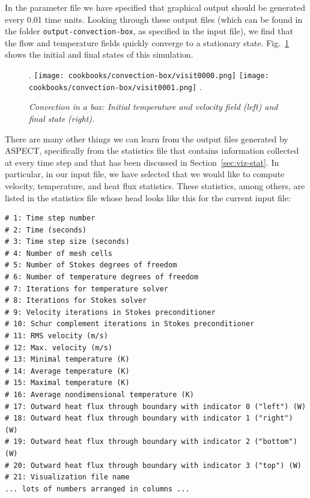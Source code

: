 \documentclass{article}
\newcommand{\aspect}{\textsc{ASPECT}}
\begin{document}
In the parameter file we have specified that graphical output should be
generated every 0.01 time units. Looking through these output files (which can
be found in the folder \texttt{output-convection-box}, as specified in the input file), we find
that the flow and temperature fields quickly converge to a stationary state.
Fig.~\ref{fig:convection-box-fields} shows the initial and final states of this
simulation.

\begin{figure}
\phantom.
\hfill
\texttt{[image: cookbooks/convection-box/visit0000.png]}
\hfill
\texttt{[image: cookbooks/convection-box/visit0001.png]}
\hfill
\phantom.
\caption{\it Convection in a box: Initial temperature and velocity field (left)
and final state (right).}
\label{fig:convection-box-fields}
\end{figure}

There are many other things we can learn from the output files generated by
\aspect{}, specifically from the statistics file that contains information
collected at every time step and that has been discussed in
Section~\ref{sec:viz-stat}. In particular, in our input file, we have selected
that we would like to compute velocity, temperature, and heat flux statistics.
These statistics, among others, are listed in the statistics file whose head
looks like this for the current input file:
\begin{lstlisting}[frame=single,language=prmfile]
# 1: Time step number
# 2: Time (seconds)
# 3: Time step size (seconds)
# 4: Number of mesh cells
# 5: Number of Stokes degrees of freedom
# 6: Number of temperature degrees of freedom
# 7: Iterations for temperature solver
# 8: Iterations for Stokes solver
# 9: Velocity iterations in Stokes preconditioner
# 10: Schur complement iterations in Stokes preconditioner
# 11: RMS velocity (m/s)
# 12: Max. velocity (m/s)
# 13: Minimal temperature (K)
# 14: Average temperature (K)
# 15: Maximal temperature (K)
# 16: Average nondimensional temperature (K)
# 17: Outward heat flux through boundary with indicator 0 ("left") (W)
# 18: Outward heat flux through boundary with indicator 1 ("right") (W)
# 19: Outward heat flux through boundary with indicator 2 ("bottom") (W)
# 20: Outward heat flux through boundary with indicator 3 ("top") (W)
# 21: Visualization file name
... lots of numbers arranged in columns ...
\end{lstlisting}
\end{document}
